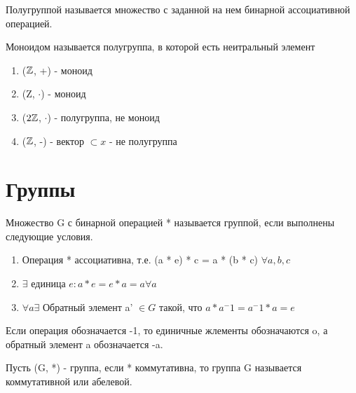 \begin{definition}
    Полугруппой называется множество с заданной на нем бинарной ассоциативной операцией.
\end{definition}

\begin{definition}
    Моноидом называется полугруппа, в которой есть неитральный элемент
\end{definition}

\begin{eg}
    \begin{enumerate}
        \item ($\mathbb{Z}$, +) - моноид
        \item (Z, $\cdot$) - моноид
        \item ($2\mathbb{Z}$, $\cdot$) - полугруппа, не моноид
        \item ($\mathbb{Z}$, -) - вектор $\subset x$ - не полугруппа
    \end{enumerate}
\end{eg}

\section{Группы}

\begin{definition}
    Множество G с бинарной операцией * называется группой, если выполнены следующие условия.

    \begin{enumerate}
        \item Операция * ассоциативна, т.е. (a * e) * c = a * (b * c) $\forall a, b, c$
        \item $\exists$ единица $e: a * e = e * a = a \forall a$
        \item $\forall a \exists$ Обратный элемент a' $\in G$ такой, что $a * a^-1 = a^-1 * a = e$
    \end{enumerate}
\end{definition}

\begin{notation}
    Если операция обозначается -1, то единичные жлементы обозначаются o, а обратный элемент a обозначается -a.
\end{notation}

\begin{definition}
    Пусть (G, *) - группа, если * коммутативна, то группа G называется коммутативной или абелевой.
\end{definition}
